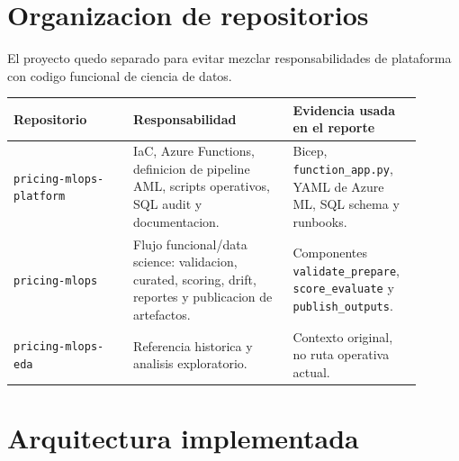 \documentclass[11pt,letterpaper]{article}
\newcommand{\code}[1]{\texttt{\small #1}}
\begin{document}
\section*{Organizacion de repositorios}

El proyecto quedo separado para evitar mezclar responsabilidades de plataforma con codigo funcional de ciencia de datos.

\begin{longtable}{p{0.27\linewidth}p{0.36\linewidth}p{0.27\linewidth}}
\toprule
\textbf{Repositorio} & \textbf{Responsabilidad} & \textbf{Evidencia usada en el reporte}\\
\midrule
\endhead
\code{pricing-mlops-platform} & IaC, Azure Functions, definicion de pipeline AML, scripts operativos, SQL audit y documentacion. & Bicep, \code{function\_app.py}, YAML de Azure ML, SQL schema y runbooks.\\
\code{pricing-mlops} & Flujo funcional/data science: validacion, curated, scoring, drift, reportes y publicacion de artefactos. & Componentes \code{validate\_prepare}, \code{score\_evaluate} y \code{publish\_outputs}.\\
\code{pricing-mlops-eda} & Referencia historica y analisis exploratorio. & Contexto original, no ruta operativa actual.\\
\bottomrule
\end{longtable}

\section*{Arquitectura implementada}
\end{document}

